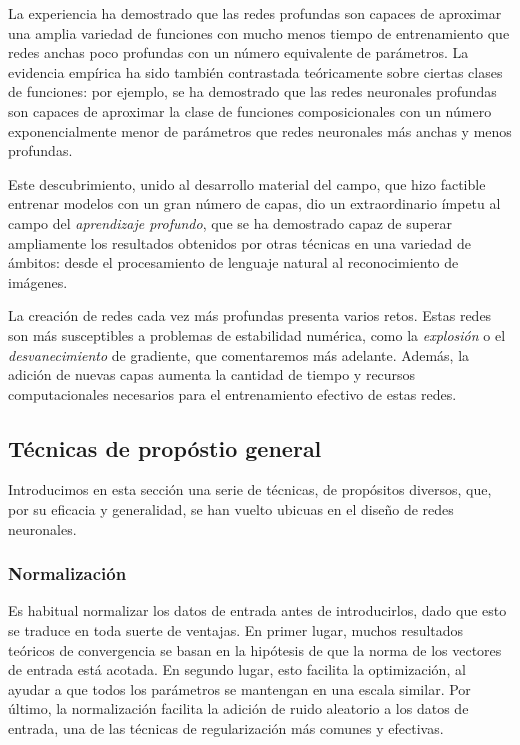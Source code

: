 La experiencia ha demostrado que las redes profundas son capaces de aproximar una amplia variedad de funciones con mucho menos tiempo de entrenamiento que redes anchas poco profundas con un número equivalente de parámetros. La evidencia empírica ha sido también contrastada teóricamente sobre ciertas clases de funciones: por ejemplo, se ha demostrado que las redes neuronales profundas son capaces de aproximar la clase de funciones composicionales con un número exponencialmente menor de parámetros \cite{mhaskar2017and} que redes neuronales más anchas y menos profundas. 

Este descubrimiento, unido al desarrollo material del campo, que hizo factible entrenar modelos con un gran número de capas, dio un extraordinario ímpetu al campo del \textit{aprendizaje profundo}, que se ha demostrado capaz de superar ampliamente los resultados obtenidos por otras técnicas en una variedad de ámbitos: desde el procesamiento de lenguaje natural al reconocimiento de imágenes.

La creación de redes cada vez más profundas presenta varios retos. Estas redes son más susceptibles a problemas de estabilidad numérica, como la \textit{explosión} o el \textit{desvanecimiento} de gradiente, que comentaremos más adelante. Además, la adición de nuevas capas aumenta la cantidad de tiempo y recursos computacionales necesarios para el entrenamiento efectivo de estas redes. 

\subsection{Técnicas de propóstio general}
Introducimos en esta sección una serie de técnicas, de propósitos diversos, que, por su eficacia y generalidad, se han vuelto ubicuas en el diseño de redes neuronales.  

\subsubsection{Normalización}
Es habitual normalizar los datos de entrada antes de introducirlos, dado que esto se traduce en toda suerte de ventajas. En primer lugar, muchos resultados teóricos de convergencia se basan en la hipótesis de que la norma de los vectores de entrada está acotada. En segundo lugar, esto facilita la optimización, al ayudar a que todos los parámetros se mantengan en una escala similar. Por último, la normalización facilita la adición de ruido aleatorio a los datos de entrada, una de las técnicas de regularización más comunes y efectivas. 

